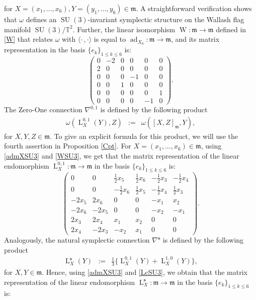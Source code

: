 \documentclass[preprint,12pt,1p]{elsarticle}
\theoremstyle{plain}
\theoremstyle{definition}
\newcommand{\met}{\langle\cdot\,,\cdot\rangle}
\newcommand{\n}{\nabla}
\newcommand{\nc}{\n^{0,1}}
\newcommand{\ns}{\n^\mathbf{s}}
\newcommand{\ad}{\operatorname{ad}}
\newcommand{\la}{\operatorname{L}^{0,1}}
\newcommand{\ls}{\operatorname{L}^\mathbf{s}}
\newcommand{\lm}{\operatorname{L}^{1,0}}
\newcommand{\F}{\operatorname{W}}
\numberwithin{equation}{section}
\newcommand{\SU}{\operatorname{SU}}
\begin{document}
for $X=(x_1,\ldots,x_6),Y=(y_1,\ldots,y_6)\in\mathfrak{m}$. A straightforward verification shows that $\omega$ defines an $\SU(3)$-invariant symplectic structure on the Wallash flag manifold $\SU(3)/\mathbb{T}^2$. Further, the linear isomorphism $\F:\mathfrak{m}\to\mathfrak{m}$ defined in \eqref{W} that relates $\omega$ with $\met$ is equal to $\ad_{X_0}:\mathfrak{m}\to\mathfrak{m}$, and its matrix representation in the basis $\{e_k\}_{1\leqslant k\leqslant 6}$ is:
\begin{equation}\label{WSU3}
\begin{pmatrix}
0&-2&0&0&0&0\\
2&0&0&0&0&0\\
0&0&0&-1&0&0\\
0&0&1&0&0&0\\
0&0&0&0&0&1\\
0&0&0&0&-1&0
\end{pmatrix}.
\end{equation}
The Zero-One connection $\nc$ is defined by the following product
\begin{eqnarray*}
\omega\left(\la_X(Y),Z\right)&:=&\omega\left([X,Z]_\mathfrak{m},Y\right),
\end{eqnarray*}
for $X,Y,Z\in\mathfrak{m}$. To give an explicit formula for this product, we will use the fourth assertion in Proposition \ref{Cpt}. For $X=(x_1,\ldots,x_6)\in\mathfrak{m}$, using \eqref{admXSU3} and \eqref{WSU3}, we get that the matrix representation of the linear endomorphism $\la_{X}:\mathfrak{m}\to\mathfrak{m}$ in the basis $\{e_k\}_{1\leqslant k\leqslant 6}$ is:
\begin{equation}\label{LcSU3}
\begin{pmatrix}
0&0&\tfrac{1}{2}x_5&\tfrac{1}{2}x_6&-\tfrac{1}{2}x_3&-\tfrac{1}{2}x_4\\
0&0&-\tfrac{1}{2}x_6&\tfrac{1}{2}x_5&-\tfrac{1}{2}x_4&\tfrac{1}{2}x_3\\
-2x_5&2x_6&0&0&-x_1&x_2\\
-2x_6&-2x_5&0&0&-x_2&-x_1\\
2x_3&2x_4&x_1&x_2&0&0\\
2x_4&-2x_3&-x_2&x_1&0&0
\end{pmatrix}.
\end{equation}
Analogously, the natural symplectic connection $\ns$ is defined by the following product
\begin{eqnarray*}
\ls_X(Y)&:=&\tfrac{1}{3}\big\{\la_X(Y)+\lm_X(Y)\big\},
\end{eqnarray*}
for $X,Y\in\mathfrak{m}$. Hence, using \eqref{admXSU3} and \eqref{LcSU3}, we obtain that the matrix representation of the linear endomorphism $\ls_X:\mathfrak{m}\to\mathfrak{m}$ in the basis $\{e_k\}_{1\leqslant k\leqslant 6}$ is: 
\end{document}
